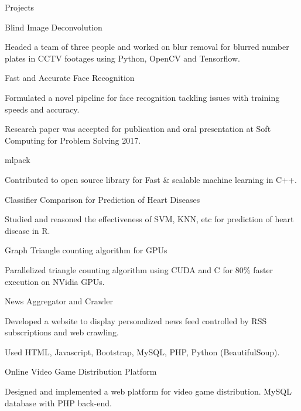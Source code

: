 \documentclass{resume} %
\begin{document}
\begin{rSection}{Projects}


\begin{rSubsection}{Blind Image Deconvolution}{}{}{}
\item Headed a team of three people and worked on blur removal for blurred number plates in CCTV footages using Python, OpenCV and Tensorflow.
\end{rSubsection}
\begin{rSubsection}{Fast and Accurate Face Recognition}{}{}{}
\item Formulated a novel pipeline for face recognition tackling issues with training speeds and accuracy. 
\item Research paper was accepted for publication and oral presentation at Soft Computing for Problem Solving 2017.
\end{rSubsection}
\begin{rSubsection}{mlpack}{}{}{}
\item Contributed to open source library for Fast \& scalable machine learning in C++.  
\end{rSubsection}

\begin{rSubsection}{Classifier Comparison for Prediction of Heart Diseases}{}{}{}
\item Studied and reasoned the effectiveness of SVM, KNN, etc for prediction of heart disease in R.
\end{rSubsection}

\begin{rSubsection}{Graph Triangle counting algorithm for GPUs}{}{}{}
\item Parallelized triangle counting algorithm using CUDA and C for 80\% faster execution on NVidia GPUs.
\end{rSubsection}

\begin{rSubsection}{News Aggregator and Crawler}{}{}{}
\item Developed a website to display personalized news feed controlled by RSS subscriptions and web crawling.
\item Used HTML, Javascript, Bootstrap, MySQL, PHP, Python (BeautifulSoup).
\end{rSubsection}
\begin{rSubsection}{Online Video Game Distribution Platform}{}{}{}
\item Designed and implemented a web platform for video game distribution. MySQL database with PHP back-end.  
\end{rSubsection}


\end{rSection}
\end{document}
